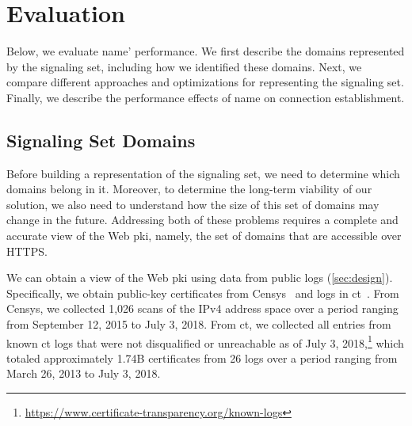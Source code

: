 \section{Evaluation}
\label{sec:evaluation}

Below, we evaluate \ac{name}' performance.
We first describe the domains represented by the signaling set,
including how we identified these domains. Next, we compare different approaches
and optimizations for representing the signaling set. Finally, we describe the
performance effects of \ac{name} on connection establishment.

\subsection{Signaling Set Domains}
\label{sec:evaluation:https}

Before building a representation of the signaling set, we need to determine
which domains belong in it. Moreover, to determine the long-term
viability of our solution, we also need to understand how the size of this set
of domains may change in the future. Addressing both of these problems requires
a complete and accurate view of the Web \ac{pki}, namely, the set of domains
that are accessible over HTTPS.

We can obtain a view of the Web \ac{pki} using data from public logs (\autoref{sec:design}). 
Specifically, we obtain public-key
certificates from Censys~\cite{durumeric2015search} and logs in
\ac{ct}~\cite{rfc6962}. From Censys, we collected 1,026 scans of the IPv4
address space over a period ranging from September 12, 2015 to July 3, 2018.
From \ac{ct}, we collected all entries from known \ac{ct} logs that were not
disqualified or unreachable as of July 3,
2018,\footnote{\url{https://www.certificate-transparency.org/known-logs}} which
totaled approximately 1.74B certificates from 26 logs over a period ranging from
March 26, 2013 to July 3, 2018.

